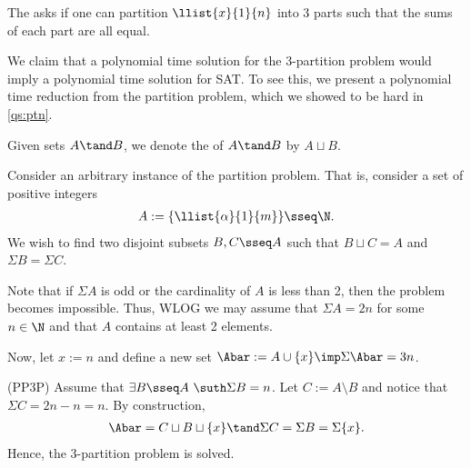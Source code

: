 \documentclass{article}
\begin{document}

\begin{subexercise}\label{qs:3ptn}
  The  asks if one can partition $ \llist{x}{1}{n} $ into 3 parts such that the sums of each part are all equal.
\end{subexercise}

\begin{solution}
  We claim that a polynomial time solution for the 3-partition problem would imply a polynomial time solution for SAT.
  To see this, we present a polynomial time reduction from the partition problem, which we showed to be hard in \ref{qs:ptn}.

  \begin{notation}
  Given sets $ A \tand B$, we denote the  of $ A\tand B $ by $ A\sqcup B $.
  \end{notation}

  Consider an arbitrary instance of the partition problem.
  That is, consider a set of positive integers \begin{align*}
    A := \{\llist{\alpha}{1}{m}\} \sseq \N.
  \end{align*}
  We wish to find two disjoint subsets $ B,C\sseq A $ such that $ B\sqcup C = A $ and $ \Sigma B = \Sigma C $.

  Note that if $ \Sigma A $ is odd or the cardinality of $ A $ is less than 2, then the problem becomes impossible.
  Thus, WLOG we may assume that $ \Sigma A = 2n $ for some $ n\in \N $ and that $ A $ contains at least 2 elements.

  Now, let $ x := n $ and define a new set $ \Abar := A\cup \{x\}\imp \Sigma \Abar = 3n $.

  \begin{subproof}[Correctness.]
    (PP\imp 3P)
    Assume that $ \exists B\sseq A\ \suth \Sigma B = n $.
    Let $ C := A \setminus B $ and notice that $ \Sigma C = 2n - n = n $.
    By construction,
    \begin{align*}
      \Abar = C\sqcup  B \sqcup \{x\} \tand \Sigma C = \Sigma B = \Sigma \{x\}.
    \end{align*}
    Hence, the 3-partition problem is solved.


\end{subproof}
\end{solution}
\end{document}
